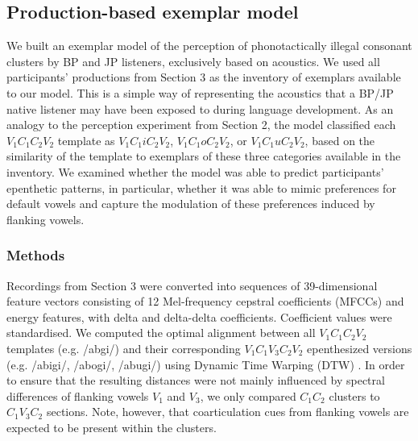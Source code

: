 \subsection{Production-based exemplar model}

We built an exemplar model of the perception of phonotactically illegal consonant clusters by BP and JP listeners, exclusively based on acoustics. We used all participants' productions from Section 3 as the inventory of exemplars available to our model. This is a simple way of representing the acoustics that a BP/JP native listener may have been exposed to during language development. As an analogy to the perception experiment from Section 2, the model classified each $V_{1}C_{1}C_{2}V_{2}$ template as $V_{1}C_{1}iC_{2}V_{2}$, $V_{1}C_{1}oC_{2}V_{2}$, or $V_{1}C_{1}uC_{2}V_{2}$, based on the similarity of the template to exemplars of these three categories available in the inventory. We examined whether the model was able to predict participants' epenthetic patterns, in particular, whether it was able to mimic preferences for default vowels and capture the modulation of these preferences induced by flanking vowels.   

\subsubsection{Methods}
Recordings from Section 3 were converted into sequences of 39-dimensional feature vectors consisting of 12 Mel-frequency cepstral coefficients (MFCCs) and energy features, with delta and delta-delta coefficients. Coefficient values were standardised. We computed the optimal alignment between all $V_{1}C_{1}C_{2}V_{2}$ templates (e.g. /abgi/) and their corresponding $V_{1}C_{1}V_{3}C_{2}V_{2}$ epenthesized versions (e.g. /abigi/, /abogi/, /abugi/) using Dynamic Time Warping (DTW) \cite{sakoe1978, R-dtw}. In order to ensure that the resulting distances were not mainly influenced by spectral differences of flanking vowels $V_{1}$ and $V_{3}$, we only compared $C_{1}C_{2}$ clusters to $C_{1}V_{3}C_{2}$ sections. Note, however, that coarticulation cues from flanking vowels are expected to be present within the clusters. 

